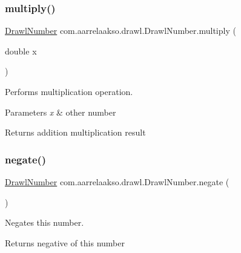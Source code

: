 \subsubsection{\texorpdfstring{multiply()}{multiply()}\hspace{0.1cm}{\footnotesize\ttfamily [3/3]}}
{\footnotesize\ttfamily \hyperlink{classcom_1_1aarrelaakso_1_1drawl_1_1_drawl_number}{Drawl\+Number} com.\+aarrelaakso.\+drawl.\+Drawl\+Number.\+multiply (\begin{DoxyParamCaption}\item[{double}]{x }\end{DoxyParamCaption})\hspace{0.3cm}{\ttfamily [protected]}}



Performs multiplication operation. 


\begin{DoxyParams}{Parameters}
{\em x} & other number \\
\hline
\end{DoxyParams}
\begin{DoxyReturn}{Returns}
addition multiplication result 
\end{DoxyReturn}
\mbox{\label{classcom_1_1aarrelaakso_1_1drawl_1_1_drawl_number_a1093e80c570f85142255528e4d31820d}} 
\subsubsection{\texorpdfstring{negate()}{negate()}}
{\footnotesize\ttfamily \hyperlink{classcom_1_1aarrelaakso_1_1drawl_1_1_drawl_number}{Drawl\+Number} com.\+aarrelaakso.\+drawl.\+Drawl\+Number.\+negate (\begin{DoxyParamCaption}{ }\end{DoxyParamCaption})\hspace{0.3cm}{\ttfamily [protected]}}



Negates this number. 

\begin{DoxyReturn}{Returns}
negative of this number 
\end{DoxyReturn}
\mbox{\label{classcom_1_1aarrelaakso_1_1drawl_1_1_drawl_number_aa88990d915ee2e7997180d96bb7b6312}} 
